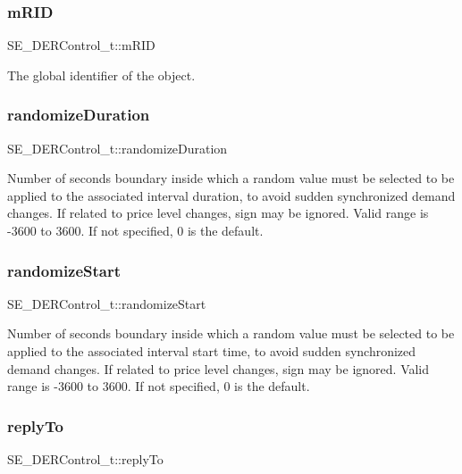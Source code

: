 \subsubsection{\texorpdfstring{m\+R\+ID}{mRID}}
{\footnotesize\ttfamily S\+E\+\_\+\+D\+E\+R\+Control\+\_\+t\+::m\+R\+ID}

The global identifier of the object. \mbox{\label{group__DERControl_ga2c4d801840699ca2af4d15228ec2b92a}} 
\subsubsection{\texorpdfstring{randomize\+Duration}{randomizeDuration}}
{\footnotesize\ttfamily S\+E\+\_\+\+D\+E\+R\+Control\+\_\+t\+::randomize\+Duration}

Number of seconds boundary inside which a random value must be selected to be applied to the associated interval duration, to avoid sudden synchronized demand changes. If related to price level changes, sign may be ignored. Valid range is -\/3600 to 3600. If not specified, 0 is the default. \mbox{\label{group__DERControl_ga0570665f45427d3bea85bb34ba79d77e}} 
\subsubsection{\texorpdfstring{randomize\+Start}{randomizeStart}}
{\footnotesize\ttfamily S\+E\+\_\+\+D\+E\+R\+Control\+\_\+t\+::randomize\+Start}

Number of seconds boundary inside which a random value must be selected to be applied to the associated interval start time, to avoid sudden synchronized demand changes. If related to price level changes, sign may be ignored. Valid range is -\/3600 to 3600. If not specified, 0 is the default. \mbox{\label{group__DERControl_ga806b4c2bc9bcd1bc266ade8162433189}} 
\subsubsection{\texorpdfstring{reply\+To}{replyTo}}
{\footnotesize\ttfamily S\+E\+\_\+\+D\+E\+R\+Control\+\_\+t\+::reply\+To}

